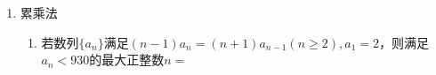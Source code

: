 \begin{enumerate}
\begin{enumerate}
        \begin{jieda}
            $\left \{ \begin{array}{l}
                 a_{2k} - a_{2k-1} = 2k  \\
                 a_{2k-1} - a_{2k-2} = 2k-2 
            \end{array}\right .$，因此$a_k - a_{2k-2} = 4k-2$，故累加得$a_{100} = a_2 + (198 + 194 + \cdots + 6) = a_2 + 4998 = a_1 + 2 + 4998 = 5001$.
        \end{jieda}
    \end{enumerate}
    \item 累乘法
    \begin{enumerate}
        \item 若数列$\{a_n\}$满足$(n-1)a_n = (n+1)a_{n-1}(n \geq 2), a_1 = 2$，则满足$a_n < 930$的最大正整数$n = $

\end{enumerate}
\end{enumerate}
